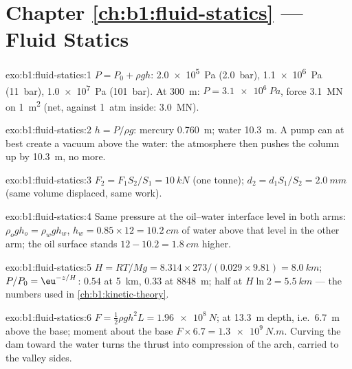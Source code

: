 \section*{Chapter \ref{ch:b1:fluid-statics} --- Fluid Statics}

\begin{solution}{exo:b1:fluid-statics:1}
$P = P_0 + \rho gh$: \qty{2.0e5}{Pa} (\qty{2.0}{bar}), \qty{1.1e6}{Pa}
(\qty{11}{bar}), \qty{1.0e7}{Pa} (\qty{101}{bar}). At \qty{300}{m}: $P =
\qty{3.1e6}{Pa}$, force \qty{3.1}{MN} on \qty{1}{m^2} (net, against
\qty{1}{atm} inside: \qty{3.0}{MN}).
\end{solution}

\begin{solution}{exo:b1:fluid-statics:2}
$h = P/\rho g$: mercury \qty{0.760}{m}; water \qty{10.3}{m}. A pump can at
best create a vacuum above the water: the atmosphere then pushes the
column up by \qty{10.3}{m}, no more.
\end{solution}

\begin{solution}{exo:b1:fluid-statics:3}
$F_2 = F_1S_2/S_1 = \qty{10}{kN}$ (one tonne); $d_2 = d_1S_1/S_2 = \qty{2.0}{mm}$
(same volume displaced, same work).
\end{solution}

\begin{solution}{exo:b1:fluid-statics:4}
Same pressure at the oil--water interface level in both arms: $\rho_og
h_o = \rho_wgh_w$, $h_w = 0.85 \times 12 = \qty{10.2}{cm}$ of water above
that level in the other arm; the oil surface stands $12 - 10.2 = \qty{1.8}{cm}$
higher.
\end{solution}

\begin{solution}{exo:b1:fluid-statics:5}
$H = RT/Mg = 8.314 \times 273/(0.029 \times 9.81) = \qty{8.0}{km}$; $P/P_0 =
\eu^{-z/H}$: $0.54$ at \qty{5}{km}, $0.33$ at \qty{8848}{m}; half at $H\ln2 =
\qty{5.5}{km}$ --- the numbers used in \cref{ch:b1:kinetic-theory}.
\end{solution}

\begin{solution}{exo:b1:fluid-statics:6}
$F = \tfrac12\rho gh^2L = \qty{1.96e8}{N}$;  at \qty{13.3}{m}
depth, i.e.\ \qty{6.7}{m} above the base; moment about the base $F \times
6.7 = \qty{1.3e9}{N.m}$. Curving the dam toward the water turns the thrust
into compression of the arch, carried to the valley sides.
\end{solution}

